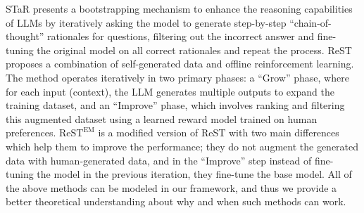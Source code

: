 STaR \citep{zelikman2022star} presents a bootstrapping mechanism to enhance the reasoning capabilities of LLMs by iteratively asking the model to generate step-by-step ``chain-of-thought'' rationales for questions, filtering out the incorrect answer and fine-tuning the original model on all correct rationales and repeat the process. ReST \citep{gulcehre2023rest} proposes a combination of self-generated data and offline reinforcement learning. The method operates iteratively in two primary phases: a ``Grow'' phase, where for each input (context), the LLM generates multiple outputs to expand the training dataset, and an ``Improve'' phase, which involves ranking and filtering this augmented dataset using a learned reward model trained on human preferences. $\text{ReST}^\text{EM}$ \citep{singh2024beyond} is a modified version of ReST with two main differences which help them to improve the performance; they do not augment the generated data with human-generated data, and in the ``Improve'' step instead of fine-tuning the model in the previous iteration, they fine-tune the base model. All of the above methods can be modeled in our framework, and thus we provide a better theoretical understanding about why and when such methods can work. %